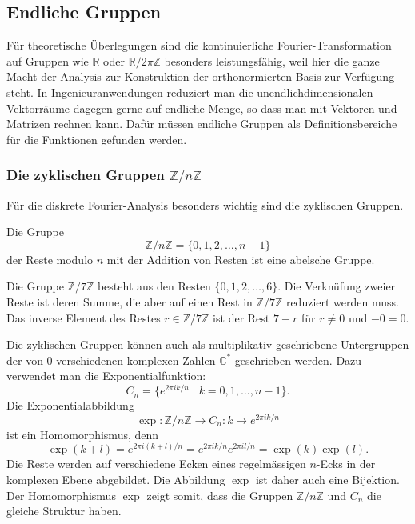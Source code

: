 %
%
%

%
%
\subsection{Endliche Gruppen
\label{buch:gruppen:subsection:endliche-gruppen}}
Für theoretische Überlegungen sind die kontinuierliche
Fourier-Transformation auf Gruppen wie $\mathbb{R}$ oder
$\mathbb{R}/2\pi\mathbb{Z}$ besonders leistungsfähig, weil hier die
ganze Macht der Analysis zur Konstruktion der orthonormierten Basis
zur Verfügung steht.
In Ingenieuranwendungen reduziert man die unendlichdimensionalen
Vektorräume dagegen gerne auf endliche Menge, so dass man mit
Vektoren und Matrizen rechnen kann.
Dafür müssen endliche Gruppen als Definitionsbereiche für die Funktionen
gefunden werden.

%
%
\subsubsection{Die zyklischen Gruppen $\mathbb{Z}/n\mathbb{Z}$}
Für die diskrete Fourier-Analysis besonders wichtig sind die zyklischen
Gruppen.
%

\begin{definition}
\label{buch:gruppen:endliche-gruppen:def:zyklisch}
Die Gruppe
\[
\mathbb{Z}/n\mathbb{Z}
=
\{0,1,2,\dots,n-1\}
\]
%
der Reste modulo $n$ mit der Addition von Resten ist eine abelsche
%
Gruppe.
\end{definition}

\begin{beispiel}
Die Gruppe $\mathbb{Z}/7\mathbb{Z}$ besteht aus den Resten
$\{0,1,2,\dots,6\}$.
Die Verknüfung zweier Reste ist deren Summe, die aber auf einen
Rest in $\mathbb{Z}/7\mathbb{Z}$ reduziert werden muss.
Das inverse Element des Restes $r\in\mathbb{Z}/7\mathbb{Z}$
ist der Rest $7-r$ für $r\ne 0$ und $-0=0$.
\end{beispiel}

Die zyklischen Gruppen können auch als multiplikativ geschriebene
Untergruppen der von $0$ verschiedenen komplexen Zahlen $\mathbb{C}^*$
geschrieben werden.
Dazu verwendet man die Exponentialfunktion:
\[
C_n
=
\{ e^{2\pi ik/n}\mid k=0,1,\dots,n-1\}.
\]
%
Die Exponentialabbildung
\[
\exp
\colon
\mathbb{Z}/n\mathbb{Z}
\to
C_n
:
k\mapsto e^{2\pi ik/n}
\]
ist ein Homomorphismus, denn
\[
\exp(k+l)
=
e^{2\pi i(k+l)/n}
=
e^{2\pi ik/n}
e^{2\pi il/n}
=
\exp(k)\exp(l).
\]
Die Reste werden auf verschiedene Ecken eines regelmässigen
$n$-Ecks in der komplexen Ebene abgebildet.
Die Abbildung $\exp$ ist daher auch eine Bijektion.
Der Homomorphismus $\exp$ zeigt somit, dass die Gruppen
$\mathbb{Z}/n\mathbb{Z}$ und $C_n$ die gleiche Struktur haben.


